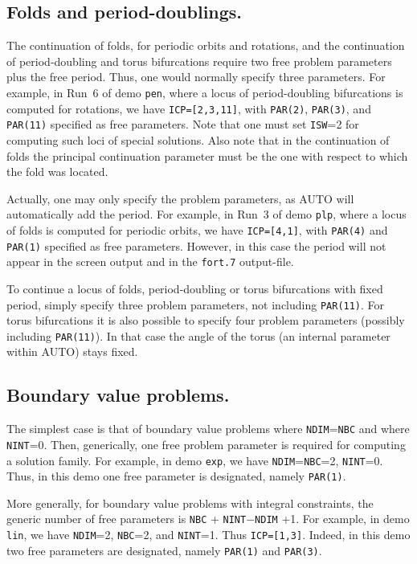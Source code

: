 \documentclass[12pt]{report}
\begin{document}
\subsection{ Folds and period-doublings.}
The continuation of folds, for periodic orbits and rotations,
and the continuation of period-doubling and torus bifurcations require two free 
problem parameters plus the free period. Thus, one would normally
specify three parameters.
For example, in Run~6 of demo {\tt pen}, where a locus of period-doubling
bifurcations is computed for rotations, we have {\tt ICP=[2,3,11]}, 
with {\tt PAR(2)}, {\tt PAR(3)}, and {\tt PAR(11)} specified as free parameters. 
Note that one must set {\tt ISW}=2 for computing such loci of special solutions.
Also note that in the continuation of folds the principal continuation parameter
must be the one with respect to which the fold was located.

Actually, one may only specify the problem parameters,
as {\cal AUTO} will automatically add the period.
For example, in Run~3 of demo {\tt plp}, where a locus of folds is computed 
for periodic orbits, we have {\tt ICP=[4,1]}, with {\tt PAR(4)} and {\tt PAR(1)} specified
as free parameters. 
However, in this case the period will not appear in the screen output 
and in the {\tt fort.7} output-file. 

To continue a locus of folds, period-doubling or torus bifurcations
with fixed period, simply
specify three problem parameters, not including {\tt PAR(11)}.
For torus bifurcations it is also possible to specify
four problem parameters (possibly including {\tt PAR(11)}). In that
case the angle of the torus (an internal parameter within AUTO)
stays fixed.

\subsection{ Boundary value problems.}
The simplest case is that of boundary value problems where 
{\tt NDIM}={\tt NBC} 
and where {\tt NINT}=0.
Then, generically, one free problem parameter is required for computing 
a solution family.
For example, in demo {\tt exp}, we have {\tt NDIM}={\tt NBC}=2, {\tt NINT}=0. 
Thus, in this demo one free parameter is designated,
namely {\tt PAR(1)}.

More generally, for boundary value problems with integral constraints,
the generic number of free parameters is {\tt NBC} + {\tt NINT}$-${\tt NDIM} +1.
For example, in demo {\tt lin}, we have {\tt NDIM}=2, {\tt NBC}=2, and {\tt NINT}=1.
Thus {\tt ICP=[1,3]}. 
Indeed, in this demo two free parameters are designated,
namely {\tt PAR(1)} and {\tt PAR(3)}.
\end{document}
